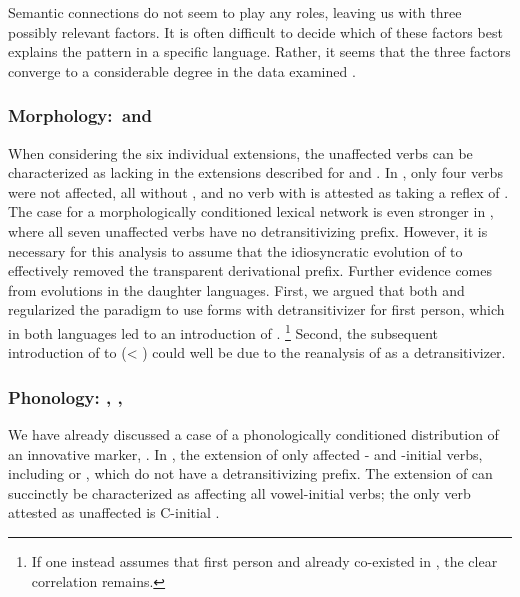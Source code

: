 Semantic connections do not seem to play any roles, leaving us with three possibly relevant factors.
It is often difficult to decide which of these factors best explains the pattern in a specific language.
Rather, it seems that the three factors converge to a considerable degree in the data examined .

\subsubsection{Morphology: \PWai and \PPek}
\label{sec:morphology}
When considering the six individual extensions, the unaffected verbs can be characterized as lacking \detrz in the extensions described for \PWai and \PPek.
In \PWai, only four verbs were not affected, all without \detrz, and no verb with \detrz is attested as taking a reflex of .
The case for a morphologically conditioned lexical network is even stronger in \PPek, where all seven unaffected verbs have no detransitivizing prefix.
However, it is necessary for this analysis to assume that the idiosyncratic evolution of   to  effectively removed the transparent derivational prefix.
Further evidence comes from evolutions in the daughter languages.
First, we argued that both \ikpeng and \bakairi regularized the paradigm to use forms with detransitivizer for first person, which in both languages led to an introduction of .%
\footnote{If one instead assumes that first person  and  already co-existed in \PPek, the clear correlation remains.}
Second, the subsequent introduction of  to \ikpeng {}  (< ) could well be due to the reanalysis of  as a detransitivizer.

\subsubsection{Phonology: \akuriyo, \carijo, \yukpa}
\label{sec:phonology}
We have already discussed a case of a phonologically conditioned distribution of an innovative marker, \akuriyo {} .
In \carijo, the extension of  only affected - and -initial verbs, including   or  , which do not have a detransitivizing prefix.
The extension of \yukpa {} can succinctly be characterized as affecting all vowel-initial verbs; the only verb attested as unaffected is C-initial  .

